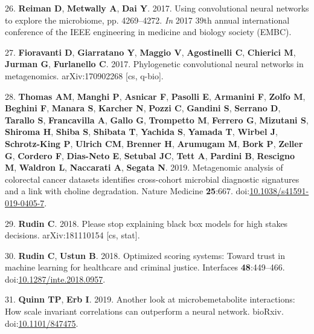 \documentclass[11pt,]{article}
\begin{document}
\hypertarget{ref-reiman_using_2017}{}
26. \textbf{Reiman D}, \textbf{Metwally A}, \textbf{Dai Y}. 2017. Using
convolutional neural networks to explore the microbiome, pp. 4269--4272.
\emph{In} 2017 39th annual international conference of the IEEE
engineering in medicine and biology society (EMBC).

\hypertarget{ref-fioravanti_phylogenetic_2017}{}
27. \textbf{Fioravanti D}, \textbf{Giarratano Y}, \textbf{Maggio V},
\textbf{Agostinelli C}, \textbf{Chierici M}, \textbf{Jurman G},
\textbf{Furlanello C}. 2017. Phylogenetic convolutional neural networks
in metagenomics. arXiv:170902268 {[}cs, q-bio{]}.

\hypertarget{ref-thomas_metagenomic_2019}{}
28. \textbf{Thomas AM}, \textbf{Manghi P}, \textbf{Asnicar F},
\textbf{Pasolli E}, \textbf{Armanini F}, \textbf{Zolfo M},
\textbf{Beghini F}, \textbf{Manara S}, \textbf{Karcher N}, \textbf{Pozzi
C}, \textbf{Gandini S}, \textbf{Serrano D}, \textbf{Tarallo S},
\textbf{Francavilla A}, \textbf{Gallo G}, \textbf{Trompetto M},
\textbf{Ferrero G}, \textbf{Mizutani S}, \textbf{Shiroma H},
\textbf{Shiba S}, \textbf{Shibata T}, \textbf{Yachida S}, \textbf{Yamada
T}, \textbf{Wirbel J}, \textbf{Schrotz-King P}, \textbf{Ulrich CM},
\textbf{Brenner H}, \textbf{Arumugam M}, \textbf{Bork P}, \textbf{Zeller
G}, \textbf{Cordero F}, \textbf{Dias-Neto E}, \textbf{Setubal JC},
\textbf{Tett A}, \textbf{Pardini B}, \textbf{Rescigno M},
\textbf{Waldron L}, \textbf{Naccarati A}, \textbf{Segata N}. 2019.
Metagenomic analysis of colorectal cancer datasets identifies
cross-cohort microbial diagnostic signatures and a link with choline
degradation. Nature Medicine \textbf{25}:667.
doi:\href{https://doi.org/10.1038/s41591-019-0405-7}{10.1038/s41591-019-0405-7}.

\hypertarget{ref-rudin_please_2018}{}
29. \textbf{Rudin C}. 2018. Please stop explaining black box models for
high stakes decisions. arXiv:181110154 {[}cs, stat{]}.

\hypertarget{ref-rudin_optimized_2018}{}
30. \textbf{Rudin C}, \textbf{Ustun B}. 2018. Optimized scoring systems:
Toward trust in machine learning for healthcare and criminal justice.
Interfaces \textbf{48}:449--466.
doi:\href{https://doi.org/10.1287/inte.2018.0957}{10.1287/inte.2018.0957}.

\hypertarget{ref-Quinn847475}{}
31. \textbf{Quinn TP}, \textbf{Erb I}. 2019. Another look at
microbemetabolite interactions: How scale invariant correlations can
outperform a neural network. bioRxiv.
doi:\href{https://doi.org/10.1101/847475}{10.1101/847475}.
\end{document}
